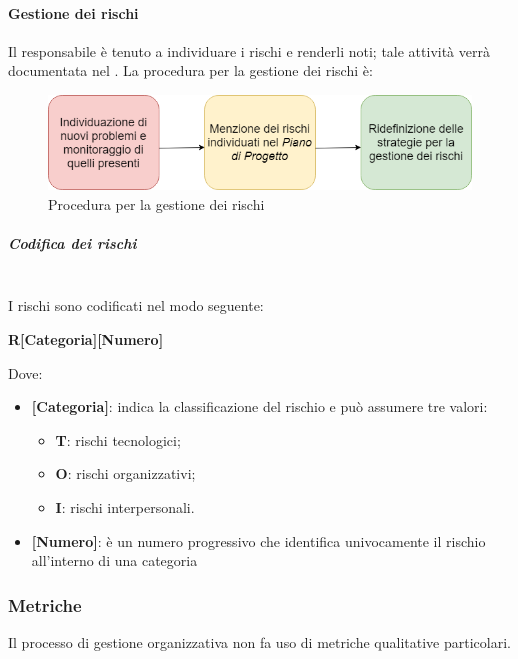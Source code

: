 \paragraph{Gestione dei rischi}
Il responsabile è tenuto a individuare i rischi e renderli noti; tale attività verrà documentata nel \PdP{}. La procedura per la gestione dei rischi è: 
\begin{figure}[!htb]
     \centering
     \includegraphics[scale=0.6]{Images/GestioneRischi.png}
     \caption{Procedura per la gestione dei rischi}
\end{figure}

\subparagraph{Codifica dei rischi} \mbox{} \\
I rischi sono codificati nel modo seguente: 
\begin{center}
\textbf{R[Categoria][Numero]}
\end{center}
Dove:
\begin{itemize}
	\item \textbf{[Categoria]}: indica la classificazione del rischio e può assumere tre valori:
	\begin{itemize}
		\item  \textbf{T}: rischi tecnologici; 
		\item \textbf{O}: rischi organizzativi;
		\item   \textbf{I}: rischi interpersonali.
	\end{itemize}
	\item \textbf{[Numero]}: è un numero progressivo che identifica univocamente il rischio all'interno di una categoria
\end{itemize}

\subsubsection{Metriche}
Il processo di gestione organizzativa non fa uso di metriche qualitative particolari.

